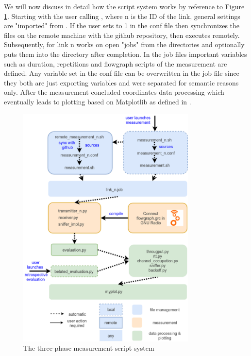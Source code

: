 We will now discuss in detail how the script system works by reference to Figure \ref{fig:script-system}.
Starting with the user calling , where n is the ID of the link, general settings are "imported" from . If the user sets  to 1 in the conf file then  synchronizes the files on the remote machine with the github repository, then executes  remotely. Subsequently,  for link n works on open "jobs" from the  directories and optionally puts them into the  directory after completion. In the job files important variables such as duration, repetitions and flowgraph scripts of the measurement are defined. Any variable set in the conf file can be overwritten in the job file since they both are just exporting variables and were separated for semantic reasons only. After the measurement concluded  coordinates data processing which eventually leads to plotting based on Matplotlib as defined in .

\begin{figure}[tb]
	\label{fig:script-system}
	\begin{center}
		\includegraphics[width=0.8\textwidth]{pictures/script_system}
	\end{center}
	\caption{The three-phase measurement script system}
\end{figure}

